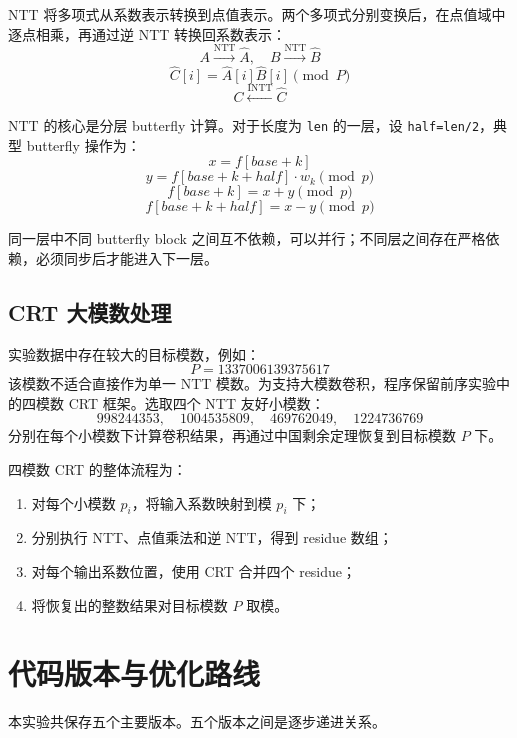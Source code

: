 \documentclass[a4paper]{article}
\begin{document}
NTT 将多项式从系数表示转换到点值表示。两个多项式分别变换后，在点值域中逐点相乘，再通过逆 NTT 转换回系数表示：
\[
A \xrightarrow{\mathrm{NTT}} \hat{A},\quad
B \xrightarrow{\mathrm{NTT}} \hat{B}
\]
\[
\hat{C}[i]=\hat{A}[i]\hat{B}[i]\pmod P
\]
\[
C \xleftarrow{\mathrm{INTT}} \hat{C}
\]

NTT 的核心是分层 butterfly 计算。对于长度为 \texttt{len} 的一层，设 \texttt{half=len/2}，典型 butterfly 操作为：
\[
x=f[base+k]
\]
\[
y=f[base+k+half]\cdot w_k\pmod p
\]
\[
f[base+k]=x+y\pmod p
\]
\[
f[base+k+half]=x-y\pmod p
\]

同一层中不同 butterfly block 之间互不依赖，可以并行；不同层之间存在严格依赖，必须同步后才能进入下一层。

\subsection{CRT 大模数处理}

实验数据中存在较大的目标模数，例如：
\[
P=1337006139375617
\]
该模数不适合直接作为单一 NTT 模数。为支持大模数卷积，程序保留前序实验中的四模数 CRT 框架。选取四个 NTT 友好小模数：
\[
998244353,\quad 1004535809,\quad 469762049,\quad 1224736769
\]
分别在每个小模数下计算卷积结果，再通过中国剩余定理恢复到目标模数 $P$ 下。

四模数 CRT 的整体流程为：
\begin{enumerate}
    \item 对每个小模数 $p_i$，将输入系数映射到模 $p_i$ 下；
    \item 分别执行 NTT、点值乘法和逆 NTT，得到 residue 数组；
    \item 对每个输出系数位置，使用 CRT 合并四个 residue；
    \item 将恢复出的整数结果对目标模数 $P$ 取模。
\end{enumerate}

\section{代码版本与优化路线}

本实验共保存五个主要版本。五个版本之间是逐步递进关系。
\end{document}

